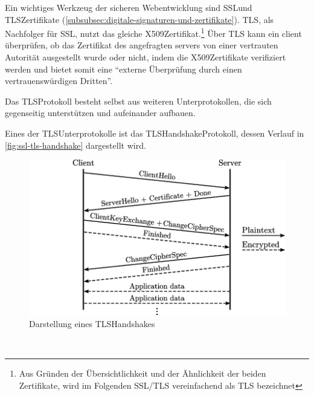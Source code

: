 Ein wichtiges Werkzeug der sicheren Webentwicklung sind \ac{SSL}\nonbreakdash  und \ac{TLS}\nonbreakdash Zertifikate (\autoref{subsubsec:digitale-signaturen-und-zertifikate}).
\ac{TLS}, als Nachfolger für \ac{SSL}, nutzt das gleiche \gls{X509}\nonbreakdash Zertifikat.\footnote{Aus Gründen der Übersichtlichkeit und der Ähnlichkeit der beiden Zertifikate, wird im Folgenden \ac{SSL}/\ac{TLS} vereinfachend als \ac{TLS} bezeichnet}
Über \ac{TLS} kann ein \gls{client} überprüfen, ob das Zertifikat des angefragten \glspl{server} von einer vertrauten Autorität ausgestellt wurde oder nicht, indem die  \gls{X509}\nonbreakdash Zertifikate verifiziert werden\autocite[\vglf][\pagef~1]{zhang-analysis-2014} und bietet somit eine \enquote{externe Überprüfung durch einen vertrauenswürdigen Dritten}.\autocite[Grund № 3]{CloudfareWarumHTTPS:online}

Das \ac{TLS}\nonbreakdash Protokoll besteht selbst aus weiteren Unterprotokollen, die sich gegenseitig unterstützen und aufeinander aufbauen.

\label{par:tls_handshake_protocol}
Eines der \ac{TLS}\nonbreakdash Unterprotokolle ist das \ac{TLS}\nonbreakdash Handshake\nonbreakdash Protokoll, dessen Verlauf in \autoref{fig:ssl-tls-handshake}\autocite[Aus][]{SslTlsFingerprint:2015} dargestellt wird.

\begin{figure}[htpb]
    \centering
    \includegraphics[width=1\linewidth]{src/abbildungen/ssl-tls-handshake}
    \caption[Darstellung eines SSL/TLS-Handshakes]{Darstellung eines \ac{TLS}\nonbreakdash Handshakes\footnotemark}
    \label{fig:ssl-tls-handshake}
\end{figure}\ 

